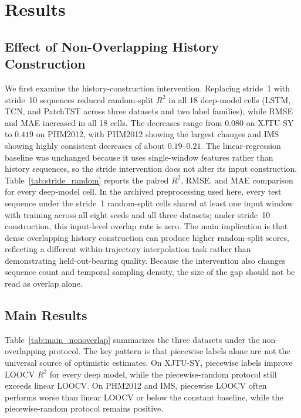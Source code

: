 \documentclass[pdflatex,sn-basic,NameDate]{sn-jnl}
\begin{document}
\section{Results}
\subsection{Effect of Non-Overlapping History Construction}
We first examine the history-construction intervention. Replacing stride~1 with stride~10 sequences reduced random-split $R^2$ in all 18 deep-model cells (LSTM, TCN, and PatchTST across three datasets and two label families), while RMSE and MAE increased in all 18 cells. The decreases range from $0.080$ on XJTU-SY to $0.419$ on PHM2012, with PHM2012 showing the largest changes and IMS showing highly consistent decreases of about $0.19$--$0.21$. The linear-regression baseline was unchanged because it uses single-window features rather than history sequences, so the stride intervention does not alter its input construction. Table~\ref{tab:stride_random} reports the paired $R^2$, RMSE, and MAE comparison for every deep-model cell. In the archived preprocessing used here, every test sequence under the stride~1 random-split cells shared at least one input window with training across all eight seeds and all three datasets; under stride~10 construction, this input-level overlap rate is zero. The main implication is that dense overlapping history construction can produce higher random-split scores, reflecting a different within-trajectory interpolation task rather than demonstrating held-out-bearing quality. Because the intervention also changes sequence count and temporal sampling density, the size of the gap should not be read as overlap alone.



\subsection{Main Results}
Table~\ref{tab:main_nonoverlap} summarizes the three datasets under the non-overlapping protocol. The key pattern is that piecewise labels alone are not the universal source of optimistic estimates. On XJTU-SY, piecewise labels improve LOOCV $R^2$ for every deep model, while the piecewise-random protocol still exceeds linear LOOCV. On PHM2012 and IMS, piecewise LOOCV often performs worse than linear LOOCV or below the constant baseline, while the piecewise-random protocol remains positive.
\end{document}
